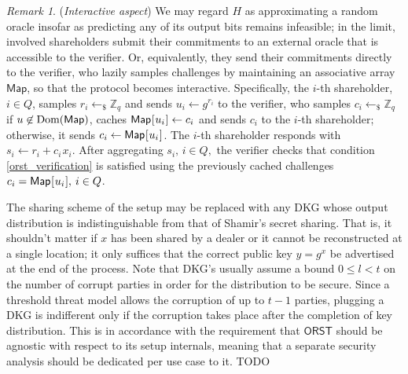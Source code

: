 \documentclass[psamsfonts, reqno]{amsart}
\theoremstyle{definition}
\theoremstyle{remark}
\newtheorem{rem}[thm]{Remark}
\numberwithin{equation}{section}
\begin{document}
\begin{rem}\label{orst_interactive}
(\textit{Interactive aspect})
We may regard $H$ as approximating
a random oracle insofar as predicting any of its output bits
remains infeasible; in the limit,
involved shareholders submit their commitments
to an external oracle that is accessible to the verifier.
Or, equivalently, they send their commitments
directly to the verifier, who lazily samples challenges
by maintaining an associative array $\mathsf{Map}$,
so that the protocol becomes interactive.
Specifically, the $i$-th shareholder, $i \in Q$,
samples $r_i \leftarrow_\$ \mathbb{Z}_q$
and sends $u_i \leftarrow g ^ {r_i}$ to the verifier,
who samples
$c_i \leftarrow_\$ \mathbb{Z}_q$
if $ u \not \in \textup{Dom}(\mathsf{Map})$,
caches
$\mathsf{Map}\hspace{0.5pt}
[\hspace{0.5pt}u_i\hspace{0.5pt}]\leftarrow c_i$
and sends $c_i$ to the $i$-th shareholder;
otherwise, it sends
$c_i \leftarrow \mathsf{Map}\hspace{0.5pt}
[\hspace{0.5pt}u_i\hspace{0.5pt}]$.
The $i$-th shareholder responds with
$s_i \leftarrow r_i + c_i\hspace{1pt}x_i$.
After aggregating
$s_i,\hspace{2pt} i \in Q,$
the verifier checks that condition
\eqref{orst_verification} is satisfied using
the previously cached challenges
$c_i = \mathsf{Map}\hspace{0.5pt}
[\hspace{0.5pt}u_i\hspace{0.5pt}],\hspace{2pt} i \in Q$.
\end{rem}

\noindent
The sharing scheme of the setup may be replaced
with any DKG whose output distribution
is indistinguishable from that of Shamir's secret sharing.
That is, it shouldn't matter if $x$ has been shared by a dealer
or it cannot be reconstructed at a single location; it only
suffices that the correct public key
$y = g ^ x$ be advertised at the end of the process.
Note that DKG's usually assume a bound $0 \le l < t$
on the number of corrupt parties
in order for the distribution to be secure.
Since a threshold threat model allows the corruption
of up to $t-1$ parties, plugging a DKG is indifferent
only if the corruption takes place
after the completion of key distribution.
This is in accordance with the requirement
that $\mathsf{ORST}$ should be agnostic
with respect to its setup internals,
meaning that a separate security analysis
should be dedicated per use case to it.
TODO
\end{document}
